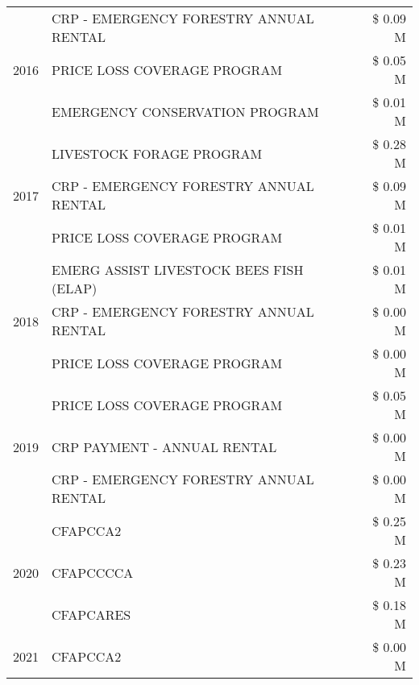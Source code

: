 \begin{tabular}{llr}
\cline{1-3}
\multirow[t]{3}{*}{2016} & CRP - EMERGENCY FORESTRY ANNUAL RENTAL & \$ 0.09 M \\
 & PRICE LOSS COVERAGE PROGRAM & \$ 0.05 M \\
 & EMERGENCY CONSERVATION PROGRAM & \$ 0.01 M \\
\cline{1-3}
\multirow[t]{3}{*}{2017} & LIVESTOCK FORAGE PROGRAM & \$ 0.28 M \\
 & CRP - EMERGENCY FORESTRY ANNUAL RENTAL & \$ 0.09 M \\
 & PRICE LOSS COVERAGE PROGRAM & \$ 0.01 M \\
\cline{1-3}
\multirow[t]{3}{*}{2018} & EMERG ASSIST LIVESTOCK BEES FISH (ELAP) & \$ 0.01 M \\
 & CRP - EMERGENCY FORESTRY ANNUAL RENTAL & \$ 0.00 M \\
 & PRICE LOSS COVERAGE PROGRAM & \$ 0.00 M \\
\cline{1-3}
\multirow[t]{3}{*}{2019} & PRICE LOSS COVERAGE PROGRAM & \$ 0.05 M \\
 & CRP PAYMENT - ANNUAL RENTAL & \$ 0.00 M \\
 & CRP - EMERGENCY FORESTRY ANNUAL RENTAL & \$ 0.00 M \\
\cline{1-3}
\multirow[t]{3}{*}{2020} & CFAPCCA2 & \$ 0.25 M \\
 & CFAPCCCCA & \$ 0.23 M \\
 & CFAPCARES & \$ 0.18 M \\
\cline{1-3}
2021 & CFAPCCA2 & \$ 0.00 M \\
\cline{1-3}
\bottomrule
\end{tabular}

